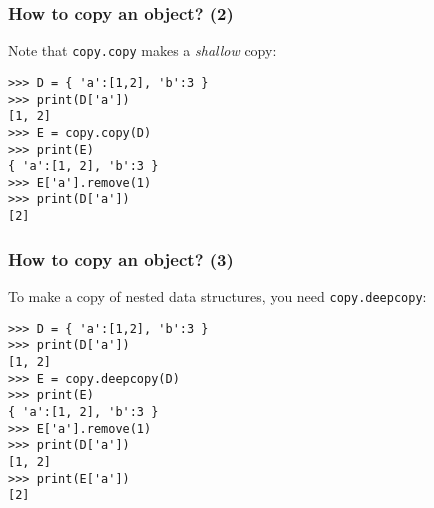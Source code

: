 \documentclass[english,serif,mathserif,xcolor=pdftex,dvipsnames,table]{beamer}
\begin{document}
\begin{frame}[fragile]
  \frametitle{How to copy an object? (2)}
Note that \texttt{copy.copy} makes a \emph{shallow} copy:
  \begin{lstlisting}
>>> D = { 'a':[1,2], 'b':3 }
>>> print(D['a'])
[1, 2]
>>> E = copy.copy(D)
>>> print(E)
{ 'a':[1, 2], 'b':3 }
>>> E['a'].remove(1)
>>> print(D['a'])
[2]
  \end{lstlisting}
\end{frame}


\begin{frame}[fragile]
  \frametitle{How to copy an object? (3)}
To make a copy of nested data structures, you need \texttt{copy.deepcopy}:
  \begin{lstlisting}
>>> D = { 'a':[1,2], 'b':3 }
>>> print(D['a'])
[1, 2]
>>> E = copy.deepcopy(D)
>>> print(E)
{ 'a':[1, 2], 'b':3 }
>>> E['a'].remove(1)
>>> print(D['a'])
[1, 2]
>>> print(E['a'])
[2]
  \end{lstlisting}
\end{frame}
\end{document}
